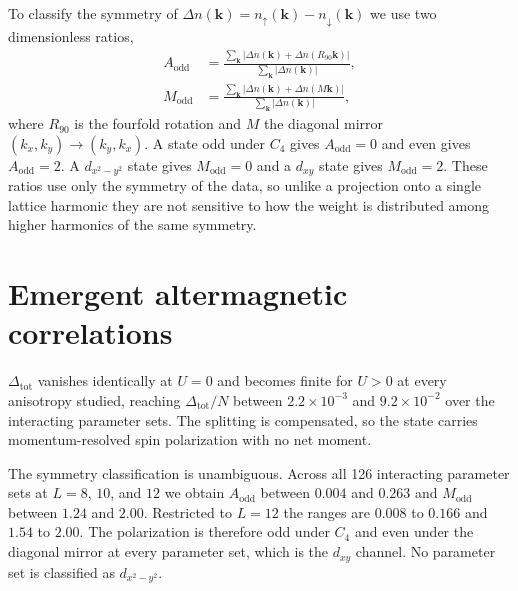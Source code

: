 \documentclass[aps,prb,reprint,superscriptaddress,amsmath,amssymb,floatfix]{revtex4-2}
\begin{document}
To classify the symmetry of $\Delta n(\bm{k}) = n_{\uparrow}(\bm{k}) - n_{\downarrow}(\bm{k})$
we use two dimensionless ratios,
\begin{align}
A_{\mathrm{odd}} &= \frac{\sum_{\bm{k}} \left| \Delta n(\bm{k}) + \Delta n(R_{90}\bm{k}) \right|}
                         {\sum_{\bm{k}} \left| \Delta n(\bm{k}) \right|},
\label{eq:aodd}\\
M_{\mathrm{odd}} &= \frac{\sum_{\bm{k}} \left| \Delta n(\bm{k}) + \Delta n(M\bm{k}) \right|}
                         {\sum_{\bm{k}} \left| \Delta n(\bm{k}) \right|},
\label{eq:modd}
\end{align}
where $R_{90}$ is the fourfold rotation and $M$ the diagonal mirror
$(k_x,k_y) \to (k_y,k_x)$. A state odd under $C_4$ gives
$A_{\mathrm{odd}} = 0$ and even gives $A_{\mathrm{odd}} = 2$. A $d_{x^2-y^2}$
state gives $M_{\mathrm{odd}} = 0$ and a $d_{xy}$ state gives
$M_{\mathrm{odd}} = 2$. These ratios use only the symmetry of the data, so
unlike a projection onto a single lattice harmonic they are not sensitive to
how the weight is distributed among higher harmonics of the same symmetry.

\section{Emergent altermagnetic correlations}
\label{sec:order}

$\Delta_{\mathrm{tot}}$ vanishes identically at $U = 0$ and becomes finite for
$U > 0$ at every anisotropy studied, reaching $\Delta_{\mathrm{tot}}/N$ between
$2.2\times10^{-3}$ and $9.2\times10^{-2}$ over the interacting parameter sets.
The splitting is compensated, so the state carries momentum-resolved spin
polarization with no net moment.

The symmetry classification is unambiguous. Across all 126 interacting parameter
sets at $L = 8$, $10$, and $12$ we obtain $A_{\mathrm{odd}}$ between $0.004$ and
$0.263$ and $M_{\mathrm{odd}}$ between $1.24$ and $2.00$.
Restricted to $L = 12$ the ranges are $0.008$ to $0.166$ and $1.54$ to $2.00$.
The polarization is therefore odd under $C_4$ and even under the diagonal
mirror at every parameter set, which is the $d_{xy}$ channel. No parameter set
is classified as $d_{x^2-y^2}$.
\end{document}
